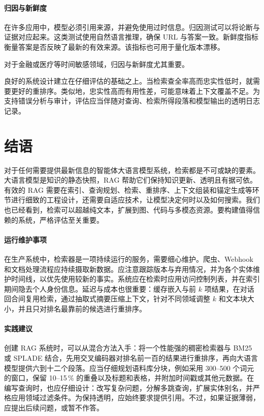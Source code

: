 \paragraph{归因与新鲜度} 在许多应用中，模型必须引用来源，并避免使用过时信息。归因测试可以将论断与证据对应起来。这类测试使用自然语言推理，确保 URL 与答案一致。新鲜度指标衡量答案是否反映了最新的有效来源。该指标也可用于量化版本漂移。

对于金融或医疗等时间敏感领域，归因与新鲜度尤其重要。

良好的系统设计建立在仔细评估的基础之上。当检索查全率高而忠实性低时，就需要更好的重排序。类似地，忠实性高而有用性差，可能意味着上下文覆盖不足。为支持错误分析与审计，评估应当伴随对查询、检索所得段落和模型输出的透明日志记录。







\section{结语}

对于任何需要提供最新信息的智能体大语言模型系统，检索都是不可或缺的要素。大语言模型是知识的静态快照，RAG 帮助它们保持知识更新、透明且有据可依。有效的 RAG 需要在索引、查询规划、检索、重排序、上下文组装和锚定生成等环节进行细致的工程设计，还需要自适应技术，让模型决定何时以及如何搜索。我们也已经看到，检索可以超越纯文本，扩展到图、代码与多模态资源。要构建值得信赖的系统，严格评估至关重要。

\paragraph{运行维护事项} 在生产系统中，检索器是一项持续运行的服务，需要细心维护。爬虫、Webhook 和文档处理流程应持续摄取新数据。应注意跟踪版本与弃用情况，并为各个实体维护时间线，以优先使用较新的事实。系统应在检索时应用访问控制列表，并在索引期间隐去个人身份信息。延迟与成本也很重要：缓存嵌入与前 $k$ 项结果，在对话回合间复用检索，通过抽取式摘要压缩上下文，针对不同领域调整 $k$ 和文本块大小，并且只对排名最靠前的候选进行重排序。

\paragraph{实践建议}
创建 RAG 系统时，可以从混合方法入手：将一个性能强的稠密检索器与 BM25 或 SPLADE 结合，先用交叉编码器对排名前一百的结果进行重排序，再向大语言模型提供六到十二个段落。应当仔细规划语料库分块，例如采用 300–500 个词元的窗口，保留 10–15\,\% 的重叠以及标题和表格，并附加时间戳或其他元数据。在编写查询时，也应仔细设计：改写复杂问题，分解多跳查询，扩展实体别名，并严格应用领域过滤条件。为保持透明，应始终要求提供引用。不过，如果证据薄弱，应提出后续问题，或暂不作答。

